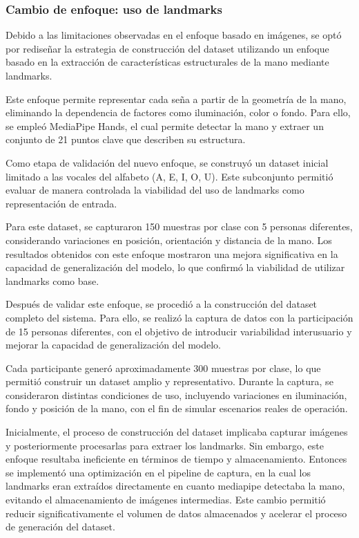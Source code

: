 	\subsubsection{Cambio de enfoque: uso de landmarks}
	
	Debido a las limitaciones observadas en el enfoque basado en imágenes, se optó por rediseñar la estrategia de construcción del dataset utilizando un enfoque basado en la extracción de características estructurales de la mano mediante landmarks.
	
	Este enfoque permite representar cada seña a partir de la geometría de la mano, eliminando la dependencia de factores como iluminación, color o fondo. Para ello, se empleó MediaPipe Hands, el cual permite detectar la mano y extraer un conjunto de 21 puntos clave que describen su estructura.

	
	Como etapa de validación del nuevo enfoque, se construyó un dataset inicial limitado a las vocales del alfabeto (A, E, I, O, U). Este subconjunto permitió evaluar de manera controlada la viabilidad del uso de landmarks como representación de entrada.
	
	Para este dataset, se capturaron 150 muestras por clase con 5 personas diferentes, considerando variaciones en posición, orientación y distancia de la mano. Los resultados obtenidos con este enfoque mostraron una mejora significativa en la capacidad de generalización del modelo, lo que confirmó la viabilidad de utilizar landmarks como base.
	
	Después de validar este enfoque, se procedió a la construcción del dataset completo del sistema. Para ello, se realizó la captura de datos con la participación de 15 personas diferentes, con el objetivo de introducir variabilidad interusuario y mejorar la capacidad de generalización del modelo.
	
	Cada participante generó aproximadamente 300 muestras por clase, lo que permitió construir un dataset amplio y representativo. Durante la captura, se consideraron distintas condiciones de uso, incluyendo variaciones en iluminación, fondo y posición de la mano, con el fin de simular escenarios reales de operación.
	
	Inicialmente, el proceso de construcción del dataset implicaba capturar imágenes y posteriormente procesarlas para extraer los landmarks. Sin embargo, este enfoque resultaba ineficiente en términos de tiempo y almacenamiento. Entonces se implementó una optimización en el pipeline de captura, en la cual los landmarks eran extraídos directamente en cuanto mediapipe detectaba la mano, evitando el almacenamiento de imágenes intermedias. Este cambio permitió reducir significativamente el volumen de datos almacenados y acelerar el proceso de generación del dataset.
	
